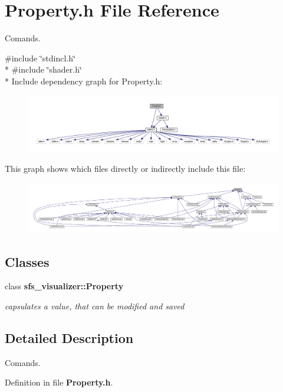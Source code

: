 \section{Property.\-h File Reference}
\label{Property_8h}


Comands.  


{\ttfamily \#include \char`\"{}stdincl.\-h\char`\"{}}\\*
{\ttfamily \#include \char`\"{}shader.\-h\char`\"{}}\\*
Include dependency graph for Property.\-h\-:\nopagebreak
\begin{figure}[H]
\begin{center}
\leavevmode
\includegraphics[width=350pt]{d1/da6/Property_8h__incl}
\end{center}
\end{figure}
This graph shows which files directly or indirectly include this file\-:\nopagebreak
\begin{figure}[H]
\begin{center}
\leavevmode
\includegraphics[width=350pt]{d6/d8e/Property_8h__dep__incl}
\end{center}
\end{figure}
\subsection*{Classes}
\begin{DoxyCompactItemize}
\item 
class {\bf sfs\-\_\-visualizer\-::\-Property}
\begin{DoxyCompactList}\small\item\em capsulates a value, that can be modified and saved \end{DoxyCompactList}\end{DoxyCompactItemize}


\subsection{Detailed Description}
Comands. 

Definition in file {\bf Property.\-h}.

